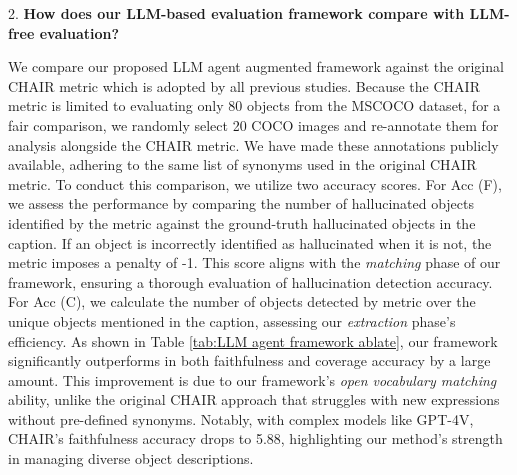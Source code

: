 2. \textbf{How does our LLM-based evaluation framework compare with LLM-free evaluation?} 

We compare our proposed LLM agent augmented framework against the original CHAIR metric which is adopted by all previous studies. Because the CHAIR metric is limited to evaluating only 80 objects from the MSCOCO dataset, for a fair comparison, we randomly select 20 COCO images and re-annotate them for analysis alongside the CHAIR metric. We have made these annotations publicly available, adhering to the same list of synonyms used in the original CHAIR metric. To conduct this comparison, we utilize two accuracy scores. For Acc (F), we assess the performance by comparing the number of hallucinated objects identified by the metric against the ground-truth hallucinated objects in the caption. If an object is incorrectly identified as hallucinated when it is not, the metric imposes a penalty of -1. This score aligns with the \textit{matching} phase of our framework, ensuring a thorough evaluation of hallucination detection accuracy. For Acc (C), we calculate the number of objects detected by metric over the unique objects mentioned in the caption, assessing our \textit{extraction} phase's efficiency. As shown in Table \ref{tab:LLM agent framework ablate}, our framework significantly outperforms in both faithfulness and coverage accuracy by a large amount. This improvement is due to our framework's \textit{open vocabulary matching} ability, unlike the original CHAIR approach that struggles with new expressions without pre-defined synonyms. Notably, with complex models like GPT-4V, CHAIR's faithfulness accuracy drops to 5.88, highlighting our method's strength in managing diverse object descriptions.

